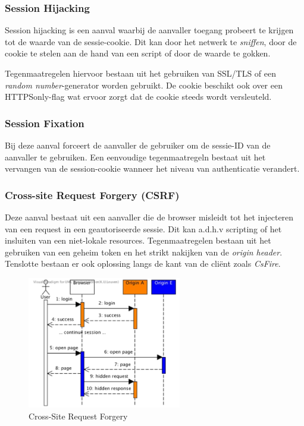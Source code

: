 \documentclass[../main.tex]{subfiles}
\begin{document}
\subsubsection{Session Hijacking}
Session hijacking is een aanval waarbij de aanvaller toegang probeert te krijgen tot de waarde van de sessie-cookie. Dit kan door het netwerk te \textit{sniffen}, door de cookie te stelen aan de hand van een script of door de waarde te gokken. 

Tegenmaatregelen hiervoor bestaan uit het gebruiken van SSL/TLS of een \textit{random number}-generator worden gebruikt. De cookie beschikt ook over een HTTPSonly-flag wat ervoor zorgt dat de cookie steeds wordt versleuteld. 

\subsubsection{Session Fixation}
Bij deze aanval forceert de aanvaller de gebruiker om de sessie-ID van de aanvaller te gebruiken. Een eenvoudige tegenmaatregeln bestaat uit het vervangen van de session-cookie wanneer het niveau van authenticatie verandert.

\subsubsection{Cross-site Request Forgery (CSRF)}
Deze aanval bestaat uit een aanvaller die de browser misleidt tot het injecteren van een request in een geautoriseerde sessie. Dit kan a.d.h.v scripting of het insluiten van een niet-lokale resources. Tegenmaatregelen bestaan uit het gebruiken van een geheim token en het strikt nakijken van de \textit{origin header}. Tenslotte bestaan er ook oplossing langs de kant van de cli\"ent zoals \textit{CsFire}.

\begin{figure}[h1]
    \centering
    \includegraphics[width=0.6\textwidth]{../images/CSRF.png}
    \caption{Cross-Site Request Forgery}
    \label{fig:awesome_image}
\end{figure}
\end{document}
